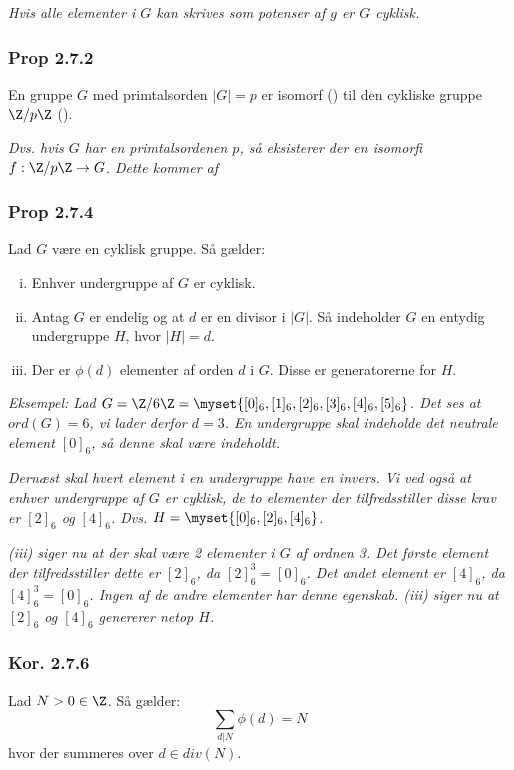 \textit{Hvis alle elementer i $G$ kan skrives som potenser af $g$ er $G$
cyklisk.}

\subsubsection{Prop 2.7.2}
En gruppe $G$ med primtalsorden $|G| = p$ er isomorf () til
den cykliske gruppe $\Z/p\Z$ ().

\textit{Dvs. hvis $G$ har en primtalsordenen $p$, så eksisterer der en isomorfi
$f: \Z/p\Z \rightarrow G$. Dette kommer af }

\subsubsection{Prop 2.7.4}
Lad $G$ være en cyklisk gruppe. Så gælder:
\begin{enumerate}[(i)]
  \item Enhver undergruppe af $G$ er cyklisk.
  \item Antag $G$ er endelig og at $d$ er en divisor i $|G|$. Så indeholder $G$
  en entydig undergruppe $H$, hvor $|H| = d$.
  \item Der er $\phi(d)$ elementer af orden $d$ i $G$. Disse er generatorerne
  for $H$.
\end{enumerate}
\textit{Eksempel: Lad $G = \Z/6\Z =
\myset{[0]_6,[1]_6,[2]_6,[3]_6,[4]_6,[5]_6}$. Det ses at $ord(G) = 6$, vi lader
derfor $d = 3$. En undergruppe skal indeholde det neutrale element $[0]_6$, så
denne skal være indeholdt.}

\textit{Dernæst skal hvert element i en undergruppe have en invers. Vi ved også at
enhver undergruppe af $G$ er cyklisk, de to elementer der tilfredsstiller
disse krav er $[2]_6$ og $[4]_6$. Dvs. $H = \myset{[0]_6,[2]_6,[4]_6}$.}

\textit{(iii) siger nu at der skal være 2 elementer i $G$ af ordnen 3. Det første
element der tilfredsstiller dette er $[2]_6$, da $[2]_{6}^3 = [0]_6$. Det andet
element er $[4]_6$, da $[4]_{6}^3 = [0]_6$. Ingen af de andre elementer har
denne egenskab.
(iii) siger nu at $[2]_6$ og $[4]_6$ genererer netop $H$.}

\subsubsection{Kor. 2.7.6}
Lad $N > 0 \in \Z$. Så gælder:
\begin{equation*}
  \sum_{d|N} \phi(d) = N
\end{equation*}
hvor der summeres over $d \in div(N)$.

